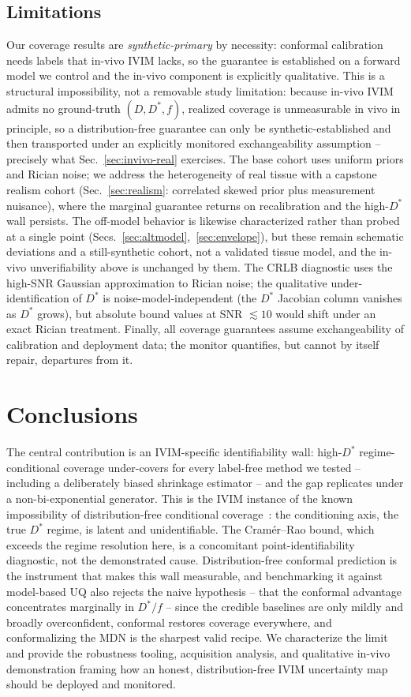 \documentclass[11pt]{article}
\newcommand{\Dstar}{D^{*}}
\begin{document}
\subsection{Limitations}
Our coverage results are \emph{synthetic-primary} by necessity: conformal calibration
needs labels that in-vivo IVIM lacks, so the guarantee is established on a forward
model we control and the in-vivo component is explicitly qualitative. This is a
structural impossibility, not a removable study limitation: because in-vivo IVIM
admits no ground-truth $(D,\Dstar,f)$, realized coverage is unmeasurable in vivo in
principle, so a distribution-free guarantee can only be synthetic-established and then
transported under an explicitly monitored exchangeability assumption -- precisely what
Sec.~\ref{sec:invivo-real} exercises. The base cohort uses uniform priors and Rician
noise; we address the heterogeneity of real tissue with a capstone realism cohort
(Sec.~\ref{sec:realism}: correlated skewed prior plus measurement nuisance), where the
marginal guarantee returns on recalibration and the high-$\Dstar$ wall persists. The
off-model behavior is likewise characterized rather than probed at a single point
(Secs.~\ref{sec:altmodel},~\ref{sec:envelope}), but these remain schematic deviations
and a still-synthetic cohort, not a validated tissue model, and the in-vivo
unverifiability above is unchanged by them. The CRLB diagnostic uses the high-SNR
Gaussian approximation to Rician noise; the qualitative under-identification of
$\Dstar$ is noise-model-independent (the $\Dstar$ Jacobian column vanishes as $\Dstar$
grows), but absolute bound values at SNR $\lesssim10$ would shift under an exact Rician
treatment. Finally, all coverage guarantees assume exchangeability of calibration and
deployment data; the monitor quantifies, but cannot by itself repair, departures from
it.

\section{Conclusions}
The central contribution is an IVIM-specific identifiability wall: high-$\Dstar$
regime-conditional coverage under-covers for every label-free method we tested --
including a deliberately biased shrinkage estimator -- and the gap replicates under a
non-bi-exponential generator. This is the IVIM instance of the known impossibility of
distribution-free conditional coverage~\citep{barber2021limits}: the conditioning
axis, the true $\Dstar$ regime, is latent and unidentifiable. The Cram\'er--Rao bound,
which exceeds the regime resolution here, is a concomitant point-identifiability
diagnostic, not the demonstrated cause. Distribution-free conformal prediction is the
instrument that makes this wall measurable, and benchmarking it against model-based UQ
also rejects the naive hypothesis -- that the conformal advantage concentrates
marginally in $\Dstar/f$ -- since the credible baselines are only mildly and broadly
overconfident, conformal restores coverage everywhere, and conformalizing the MDN is
the sharpest valid recipe. We characterize the limit and provide the robustness
tooling, acquisition analysis, and qualitative in-vivo demonstration framing how an
honest, distribution-free IVIM uncertainty map should be deployed and monitored.
\end{document}
